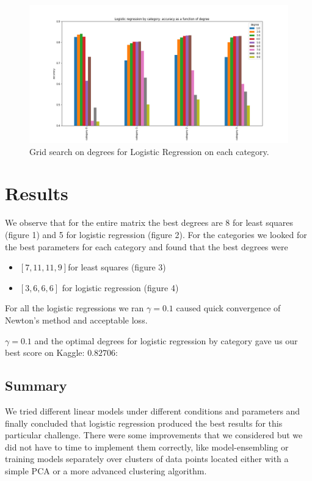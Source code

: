 \documentclass[10pt,conference,compsocconf]{IEEEtran}
\begin{document}
\begin{figure}[tbp]
  \centering
  \includegraphics[width=\columnwidth]{lr_cat_deg}
  \caption{Grid search on degrees for Logistic Regression on each category.}
  \vspace{-3mm}
  \label{fig:denoise-fourier}
\end{figure}
\section{Results}

We observe that for the entire matrix the best degrees are 8 for least squares (figure 1) and 5 for logistic regression (figure 2). For the categories we looked for the best parameters for each category and found that the best degrees were
\begin{itemize}
	\item $[7, 11, 11, 9]  $for least squares (figure 3)
	\item $[3, 6, 6, 6] $ for logistic regression (figure 4)
\end{itemize}
For all the logistic regressions we ran $\gamma = 0.1$ caused quick convergence of Newton's method
and acceptable loss.

$\gamma = 0.1$ and the optimal degrees for logistic regression by category gave us our best score on Kaggle: $0.82706$:

\begin{samepage}
\section{Summary}

We tried different linear models under different conditions and parameters and finally concluded that logistic regression produced the best results for this particular challenge. There were some improvements that we considered but we did not have to time to implement them correctly, like model-ensembling or training models separately over clusters of data points located either with a simple PCA or a more  advanced clustering algorithm.
\end{samepage}

\newpage


\end{document}
